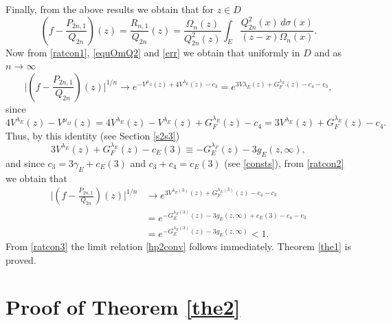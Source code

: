 \documentclass[11pt, a4paper, twoside]{article}
\def\({\left(}
\def\){\right)}
\theoremstyle{plain}
\theoremstyle{definition}
\begin{document}
Finally, from the above results we  obtain that for $z\in D$
\begin{equation}
\(f-\frac{P_{2n,1}}{Q_{2n}}\)(z)
=\frac{R_{n,1}}{Q_{2n}}(z)=\frac{\Omega_n(z)}{Q_{2n}^2(z)}
\int_E\frac{Q_{2n}^2(x)\,d\sigma(x)}{(z-x)\Omega_n(x)}.
\label{ratcon1}
\end{equation}
Now from \eqref{ratcon1}, \eqref{equOmQ2}  and \eqref{err} we obtain that uniformly in $D$ and as $n\to\infty$
\begin{equation}
\biggl|\(f-\frac{P_{2n,1}}{Q_{2n}}\)(z)\biggr|^{1/n}
\to e^{-V^{\mu_\Omega}(z)+4V^{\lambda_E}(z)-c_3}=e^{3V{\lambda_E}(z)+G_F^{\lambda_E}(z)-c_4-c_3},
\label{ratcon2}
\end{equation}
since
$$
4V^{\lambda_E}(z)-V^{\mu_\Omega}(z)=
4V^{\lambda_E}(z)-
V^{\lambda_E}(z)+G^{\lambda_E}_F(z)-c_4
=3V^{\lambda_E}(z)+G^{\lambda_E}_F(z)-c_4.
$$
Thus, by this identity (see Section \eqref{s2s3})
$$
3V^{\lambda_E}(z)+G^{\lambda_E}_F(z)-c_E(3)\equiv -G^{\lambda_F}_E(z)-3g_E(z,\infty),
$$
and since $c_3=3\gamma_E+c_E(3)$ and $c_3+c_4=c_E(3)$ (see \eqref{consts}),  
from \eqref{ratcon2} we obtain that
\begin{align}
\biggl|\(f-\frac{P_{2n,1}}{Q_{2n}}\)(z)\biggr|^{1/n}
 &\to  e^{3V^{\lambda_E(3)}(z)+G^{\lambda_E(3)}_F(z)-c_4-c_3}\nonumber\\
&=e^{-G^{\lambda_F(3)}_E(z)-3g_E(z,\infty)+c_E(3)-c_4-c_3}\nonumber\\
&=e^{-G^{\lambda_F(3)}_E(z)-3g_E(z,\infty)}<1.
\label{ratcon3}
\end{align}
From \eqref{ratcon3} the limit relation \eqref{hp2conv}  follows immediately. Theorem \ref{the1} is proved.


\section{Proof of Theorem \ref{the2}}\label{s4}
\end{document}
